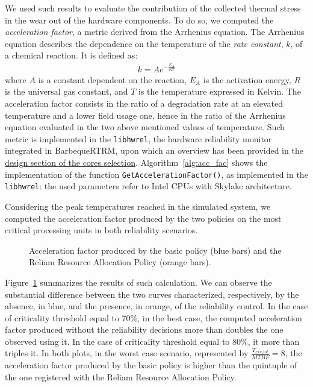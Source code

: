 We used such results to evaluate the contribution of the collected thermal stress in the wear out of the hardware components. To do so, we computed the \emph{acceleration factor}, a metric derived from the Arrhenius equation. The Arrhenius equation describes the dependence on the temperature of the \emph{rate constant}, $k$, of a chemical reaction. It is defined as:
\begin{align*}
    k = Ae^{-\frac{E_A}{RT}}
\end{align*}
where $A$ is a constant dependent on the reaction, $E_A$ is the activation energy, $R$ is the universal gas constant, and $T$ is the temperature expressed in Kelvin.
The acceleration factor consists in the ratio of a degradation rate at an elevated temperature and a lower field usage one, hence in the ratio of the Arrhenius equation evaluated in the two above mentioned values of temperature. Such metric is implemented in the \verb|libhwrel|, the hardware reliability monitor integrated in BarbequeRTRM, upon which an overview has been provided in the {\hyperref[sec:coresel]{design section of the cores selection}}. Algorithm~\ref{alg:acc_fac} shows the implementation of the function \verb|GetAccelerationFactor()|, as implemented in the \verb|libhwrel|: the used parameters refer to Intel CPUs with Skylake architecture. 



Considering the peak temperatures reached in the simulated system, we computed the acceleration factor produced by the two policies on the most critical processing units in both reliability scenarios.
\begin{figure}[t]
    \centering
    \vspace{1.1em}
    \caption{Acceleration factor produced by the basic policy (blue bars) and the Reliam Resource Allocation Policy (orange bars).}
    \label{fig:af}%
\end{figure}

 Figure~\ref{fig:af} summarizes the results of such calculation. We can observe the substantial difference between the two curves characterized, respectively, by the absence, in blue, and the presence, in orange, of the reliability control. In the case of criticality threshold equal to 70\%, in the best case, the computed acceleration factor produced without the reliability decisions more than doubles the one observed using it. In the case of criticality threshold equal to 80\%, it more than triples it.  In both plots, in the worst case scenario, represented by $\frac{T_{exc\_tot}}{MTBF}=8$, the acceleration factor produced by the basic policy is higher than the quintuple of the one registered with the Reliam Resource Allocation Policy. 

